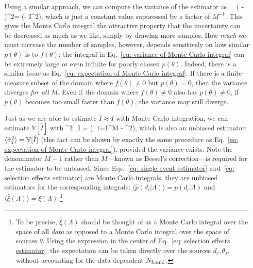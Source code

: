 \documentclass[%
 reprint,
 amsmath,amssymb,
 aps,nofootinbib,nobibnotes,onecolumn,prd
]{revtex4-2}
\begin{document}
Using a similar approach, we can compute the variance of the estimator as 
\beq
{} = \langle( - )^2\rangle = \left(\int {}\dd\theta - I^2\right),
\label{eq: variance of Monte Carlo integral}
\eeq
which is just a constant value suppressed by a factor of $M^{-1}$. This gives the Monte Carlo integral the attractive property that the uncertainty can be decreased as much as we like, simply by drawing more samples. How \textit{much} we must increase the number of samples, however, depends sensitively on how similar $p(\theta)$ is to $f(\theta)$: the integral in Eq.~\ref{eq: variance of Monte Carlo integral} can be extremely large or even infinite for poorly chosen $p(\theta)$. Indeed, there is a similar issue as Eq.~\ref{eq: expectation of Monte Carlo integral}. If there is a finite-measure subset of the domain where $f(\theta) \neq 0$ but $p(\theta) = 0$, then the variance diverges \textit{for all} $M$. Even if the domain where $f(\theta) \neq 0$ also has $p(\theta) \neq 0$, if $p(\theta)$ becomes too small faster than $f(\theta)$, the variance may still diverge.



Just as we are able to estimate $\hat{I} \approx I$ with Monte Carlo integration, we can estimate $\mathbb{V}[\hat{I}]$ with
\beq
\hat{\sigma}^2_{I} = \left(\sum_{i=1}^M - ^2\right),
\label{eq: variance estimator}
\eeq
which is also an unbiased estimator: $\langle \hat{\sigma}^2_I\rangle = \mathbb{V}[\hat{I}]$ (this fact can be shown by exactly the same procedure as Eq.~\ref{eq: expectation of Monte Carlo integral}), provided the variance exists. Note the denominator $M-1$ rather than $M$---known as Bessel's correction---is required for the estimator to be unbiased.
Since Eqs.~\ref{eq: single event estimator} and~\ref{eq: selection effects estimator} are Monte Carlo integrals, they are unbiased estimators for the corresponding integrals: $\langle\hat{p}(d_i|\Lambda)\rangle = p(d_i|\Lambda)$ and $\langle\hat{\xi}(\Lambda)\rangle = \xi(\Lambda)$.\footnote{To be precise, $\hat{\xi}(\Lambda)$ should be thought of as a Monte Carlo integral over the space of all \textit{data} as opposed to a Monte Carlo integral over the space of sources $\theta$. Using the expression in the center of Eq.~\ref{eq: selection effects estimator}, the expectation can be taken directly over the sources $d_j, \theta_j$, without accounting for the data-dependent $N_{\rm found}$.}
\end{document}
